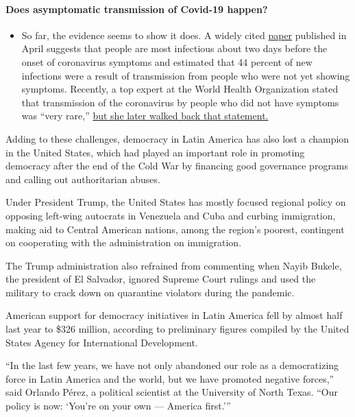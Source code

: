 \begin{itemize}
{  \paragraph{Does asymptomatic transmission of Covid-19
  happen?}\label{does-asymptomatic-transmission-of-covid-19-happen}}

  \begin{itemize}
  \tightlist
  \item
    So far, the evidence seems to show it does. A widely cited
    \href{https://www.nature.com/articles/s41591-020-0869-5}{paper}
    published in April suggests that people are most infectious about
    two days before the onset of coronavirus symptoms and estimated that
    44 percent of new infections were a result of transmission from
    people who were not yet showing symptoms. Recently, a top expert at
    the World Health Organization stated that transmission of the
    coronavirus by people who did not have symptoms was ``very rare,''
    \href{https://www.nytimes.com/2020/06/09/world/coronavirus-updates.html?action=click\&pgtype=Article\&state=default\&region=MAIN_CONTENT_3\&context=storylines_faq\#link-1f302e21}{but
    she later walked back that statement.}
  \end{itemize}
\end{itemize}

Adding to these challenges, democracy in Latin America has also lost a
champion in the United States, which had played an important role in
promoting democracy after the end of the Cold War by financing good
governance programs and calling out authoritarian abuses.

Under President Trump, the United States has mostly focused regional
policy on opposing left-wing autocrats in Venezuela and Cuba and curbing
immigration, making aid to Central American nations, among the region's
poorest, contingent on cooperating with the administration on
immigration.

The Trump administration also refrained from commenting when Nayib
Bukele, the president of El Salvador, ignored Supreme Court rulings and
used the military to crack down on quarantine violators during the
pandemic.

American support for democracy initiatives in Latin America fell by
almost half last year to \$326 million, according to preliminary figures
compiled by the United States Agency for International Development.

``In the last few years, we have not only abandoned our role as a
democratizing force in Latin America and the world, but we have promoted
negative forces,'' said Orlando Pérez, a political scientist at the
University of North Texas. ``Our policy is now: `You're on your own ---
America first.'''

